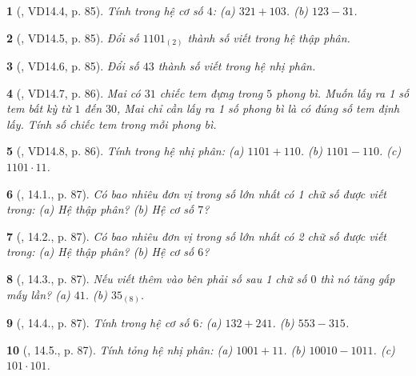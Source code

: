 \documentclass{article}
\newtheorem{baitoan}{}
\begin{document}
\begin{baitoan}[\cite{TLCT_THCS_Toan_6_so_hoc}, VD14.4, p. 85]
	Tính trong hệ cơ số $4$: (a) $321 + 103$. (b) $123 - 31$.
\end{baitoan}

\begin{baitoan}[\cite{TLCT_THCS_Toan_6_so_hoc}, VD14.5, p. 85]
	Đổi số $1101_{(2)}$ thành số viết trong hệ thập phân.
\end{baitoan}

\begin{baitoan}[\cite{TLCT_THCS_Toan_6_so_hoc}, VD14.6, p. 85]
	Đổi số $43$ thành số viết trong hệ nhị phân.
\end{baitoan}

\begin{baitoan}[\cite{TLCT_THCS_Toan_6_so_hoc}, VD14.7, p. 86]
	Mai có $31$ chiếc tem đựng trong $5$ phong bì. Muốn lấy ra 1 số tem bất kỳ từ $1$ đến $30$, Mai chỉ cần lấy ra 1 số phong bì là có đúng số tem định lấy. Tính số chiếc tem trong mỗi phong bì.
\end{baitoan}

\begin{baitoan}[\cite{TLCT_THCS_Toan_6_so_hoc}, VD14.8, p. 86]
	Tính trong hệ nhị phân: (a) $1101 + 110$. (b) $1101 - 110$. (c) $1101\cdot11$.
\end{baitoan}

\begin{baitoan}[\cite{TLCT_THCS_Toan_6_so_hoc}, 14.1., p. 87]
	Có bao nhiêu đơn vị trong số lớn nhất có 1 chữ số được viết trong: (a) Hệ thập phân? (b) Hệ cơ số $7$?
\end{baitoan}

\begin{baitoan}[\cite{TLCT_THCS_Toan_6_so_hoc}, 14.2., p. 87]
	Có bao nhiêu đơn vị trong số lớn nhất có 2 chữ số được viết trong: (a) Hệ thập phân? (b) Hệ cơ số $6$?
\end{baitoan}

\begin{baitoan}[\cite{TLCT_THCS_Toan_6_so_hoc}, 14.3., p. 87]
	Nếu viết thêm vào bên phải số sau 1 chữ số $0$ thì nó tăng gấp mấy lần? (a) $41$. (b) $35_{(8)}$.
\end{baitoan}

\begin{baitoan}[\cite{TLCT_THCS_Toan_6_so_hoc}, 14.4., p. 87]
	Tính trong hệ cơ số $6$: (a) $132 + 241$. (b) $553 - 315$.
\end{baitoan}

\begin{baitoan}[\cite{TLCT_THCS_Toan_6_so_hoc}, 14.5., p. 87]
	Tính tỏng hệ nhị phân: (a) $1001 + 11$. (b) $10010 - 1011$. (c) $101\cdot101$.
\end{baitoan}
\end{document}
